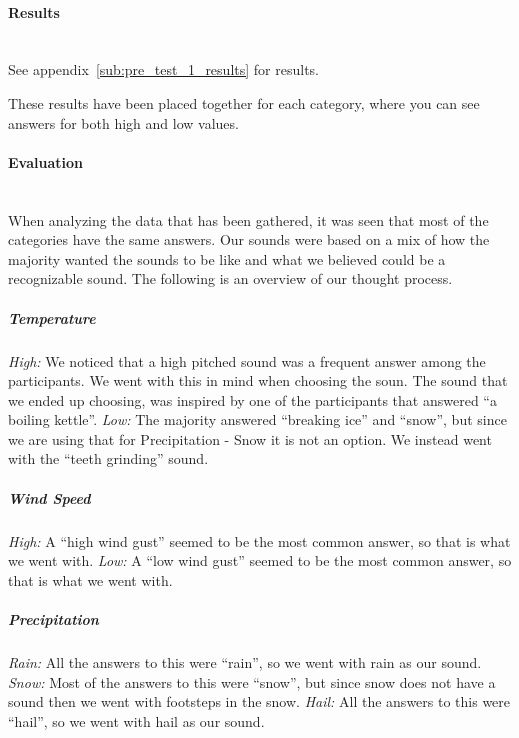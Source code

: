 
\paragraph{Results} %
\label{par:results}
\hspace{0pt} \\
See appendix~\ref{sub:pre_test_1_results} for results.

These results have been placed together for each category, where you can see answers for both high and low values. 


\paragraph{Evaluation} %
\label{par:evaluation}
\hspace{0pt} \\
When analyzing the data that has been gathered, it was seen that most of the categories have the same answers. 
Our sounds were based on a mix of how the majority wanted the sounds to be like and what we believed could be a recognizable sound. 
The following is an overview of our thought process. 

\subparagraph{Temperature} %
\label{subp:temperature}
\emph{High:} We noticed that a high pitched sound was a frequent answer among the participants. We went with this in mind when choosing the soun. 
The sound that we ended up choosing, was inspired by one of the participants that answered \enquote{a boiling kettle}. \newline
\emph{Low:} The majority answered \enquote{breaking ice} and \enquote{snow}, but since we are using that for Precipitation - Snow it is not an option. 
We instead went with the \enquote{teeth grinding} sound.

\subparagraph{Wind Speed} %
\label{subp:wind_speed}
\emph{High:} A \enquote{high wind gust} seemed to be the most common answer, so that is what we went with.
\emph{Low:} A \enquote{low wind gust} seemed to be the most common answer, so that is what we went with.

\subparagraph{Precipitation} %
\label{subp:precipitation}
\emph{Rain:} All the answers to this were \enquote{rain}, so we went with rain as our sound.
\emph{Snow:} Most of the answers to this were \enquote{snow}, but since snow does not have a sound then we went with footsteps in the snow.
\emph{Hail:} All the answers to this were \enquote{hail}, so we went with hail as our sound.

